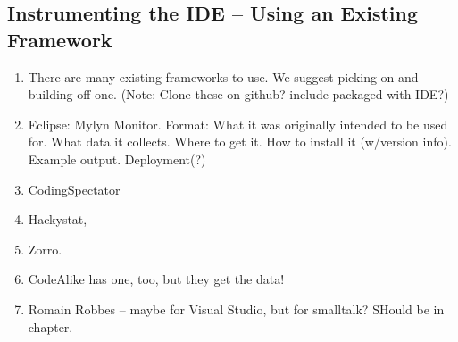 \subsection{Instrumenting the IDE -- Using an Existing Framework} %

\begin{enumerate}
	\item
	There are many existing frameworks to use. We suggest picking on and building off one. (Note: Clone these on github? include packaged with IDE?)
	
	\item Eclipse: Mylyn Monitor. Format: What it was originally intended to be used for. What data it collects. Where to get it. How to install it (w/version info). Example output. Deployment(?)
	
	\item CodingSpectator %
	
	\item Hackystat\cite{V:johnson2003beyond}, %

	\item Zorro\cite{Kou2010Operational}. %
	
	\item CodeAlike has one, too, but they get the data!
	
	\item Romain Robbes -- maybe for Visual Studio, but for smalltalk? SHould be in chapter.
\end{enumerate}

